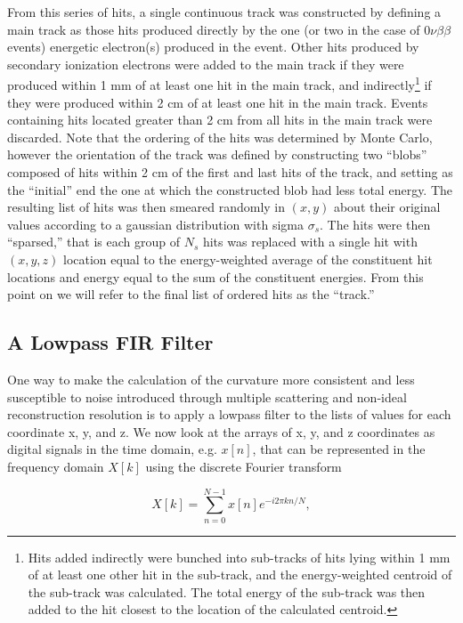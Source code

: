 \documentclass{JINST}
\begin{document}
From this series of hits, a single continuous track was constructed by defining a main track as those hits produced directly by the one (or two in the case of $0\nu\beta\beta$ events) energetic electron(s) produced in the event.  Other hits produced by secondary ionization electrons were added to the main track if they were produced within 1 mm of at least one hit in the main track, and indirectly\footnote{Hits added indirectly were bunched into sub-tracks of hits lying within 1 mm of at least one other hit in the sub-track, and the energy-weighted centroid of the sub-track was calculated.  The total energy of the sub-track was then added to the hit closest to the location of the calculated centroid.} if they were produced within 2 cm of at least one hit in the main track.  Events containing hits located greater than 2 cm from all hits in the main track were discarded.  Note that the ordering of the hits was determined by Monte Carlo, however the orientation of the track was defined by constructing two ``blobs'' composed of hits within 2 cm of the first and last hits of the track, and setting as the ``initial'' end the one at which the constructed blob had less total energy.  The resulting list of hits was then smeared randomly in $(x,y)$ about their original values according to a gaussian distribution with sigma $\sigma_{s}$.  The hits were then ``sparsed,'' that is each group of $N_{s}$ hits was replaced with a single hit with $(x,y,z)$ location equal to the energy-weighted average of the constituent hit locations and energy equal to the sum of the constituent energies.  From this point on we will refer to the final list of ordered hits as the ``track.''

\subsection{A Lowpass FIR Filter}
One way to make the calculation of the curvature more consistent and less susceptible to noise introduced through 
multiple scattering and non-ideal reconstruction resolution is to apply a lowpass filter to the lists of values for each 
coordinate x, y, and z.  We now look at the arrays of x, y, and z coordinates as digital signals in the time
domain, e.g. $x[n]$, that can be represented in the frequency domain $X[k]$ using the discrete Fourier transform

\begin{equation}
X[k] = \sum_{n=0}^{N-1}x[n]e^{-i2\pi kn/N},
\end{equation}
\end{document}
